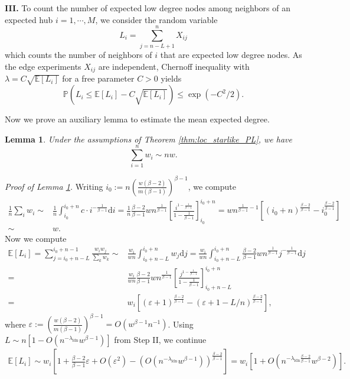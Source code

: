 \documentclass[a4paper]{article}
\theoremstyle{plain}
\newtheorem{lemma}[theorem]{Lemma}
\theoremstyle{definition}
\newcommand{\E}{\mathbb{E}}
\newcommand{\PP}{\mathbb{P}}
\begin{document}
\textbf{III.} To count the number of expected low degree nodes among neighbors of an expected hub $i=1,\cdots,M$, we consider the random variable
$$L_i=\sum_{j=n-L+1}^n X_{ij}$$
which counts the number of neighbors of $i$ that are expected low degree nodes. 
As the edge experiments $X_{ij}$ are independent, Chernoff inequality \cite[Theorem 2.7]{Chung_2006} with $\lambda= C\sqrt{\E[L_i]}$ for a free parameter $C>0$ yields
\begin{equation}\label{eq:LSL_1}
	\PP(L_i \leq \E[L_i] - C\sqrt{\E[L_i]}) \leq \exp(-C^2/2).
\end{equation}

Now we prove an auxiliary lemma to estimate the mean expected degree.
\begin{lemma}\label{lemma:nw}
	Under the assumptions of Theorem \ref{thm:loc_starlike_PL}, we have
	$$\sum_{i=1}^{n}w_i \sim nw.$$
\end{lemma}
\textit{Proof of Lemma \ref{lemma:nw}.} Writing $i_0:=n \left(\frac{w(\beta-2)}{m(\beta-1)}\right)^{\beta-1}$, we compute
\begin{align*}
	\frac{1}{n}\sum_i w_i \sim& \frac{1}{n} \int_{i_0}^{i_0+n} c \cdot i^{-\frac{1}{\beta-1}} \mathrm{d}i = \frac{1}{n}\frac{\beta-2}{\beta-1} wn^{\frac{1}{\beta-1}} \left[\frac{i^{1-\frac{1}{\beta-1}}}{1-\frac{1}{\beta-1}}\right]^{i_0+n}_{i_0} =  wn^{\frac{1}{\beta-1}-1} \left[(i_0+n)^{\frac{\beta-2}{\beta-1}} - i_0^{\frac{\beta-2}{\beta-1}}\right]\\
	\sim & w. \tag*{\qed}
\end{align*}
Now we compute
\begin{align*}
	\E[L_i]= \sum_{j=i_0+n-L}^{i_0+n-1} \frac{w_i w_j}{\sum_k w_k} \sim& \frac{w_i}{wn} \int_{i_0+n-L}^{i_0+n} w_j\mathrm{d}j= \frac{w_i}{wn}\int_{i_0+n-L}^{i_0+n} \frac{\beta-2}{\beta-1} w n^{\frac{1}{\beta-1}} j^{-\frac{1}{\beta-1}} \mathrm{d}j \\
	=& \frac{w_i}{wn} \frac{\beta-2}{\beta-1} w n^{\frac{1}{\beta-1}} \left[ \frac{j^{1-\frac{1}{\beta-1}}}{1-\frac{1}{\beta-1}}\right]_{i_0+n-L}^{i_0+n}\\
	=& %
	w_i \left[(\varepsilon+1)^{\frac{\beta-2}{\beta-1}}- (\varepsilon+1-L/n)^{\frac{\beta-2}{\beta-1}}\right],
\end{align*}
where $\varepsilon:= \left(\frac{w(\beta-2)}{m(\beta-1)}\right)^{\beta-1}=O(w^{\beta-1} n^{-1})$. Using $L\sim n\left[1-  O(n^{-\lambda_{\mathrm{ldn}}}w^{\beta-1}) \right]$ from Step II, we continue
\begin{align*}
	\E[L_i] \sim w_i \left[1+\frac{\beta-2}{\beta-1}\varepsilon +O(\varepsilon^2)- \left( O(n^{-\lambda_{\mathrm{ldn}}}w^{\beta-1}) \right)^{\frac{\beta-2}{\beta-1}}\right] = w_i \left[1+O( n^{-\lambda_{\mathrm{ldn}}\frac{\beta-2}{\beta-1}} w^{\beta-2})\right].
\end{align*}
\end{document}
